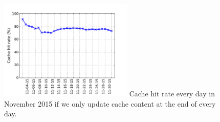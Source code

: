 \begin{figure}[t!]
\begin{center}
\includegraphics[width=2.5in]{figure/LRU_day}
{Cache hit rate every day in November 2015 if we only update cache content at the end of every day.}
\end{center}
\vspace{-0.1in}
\end{figure}
